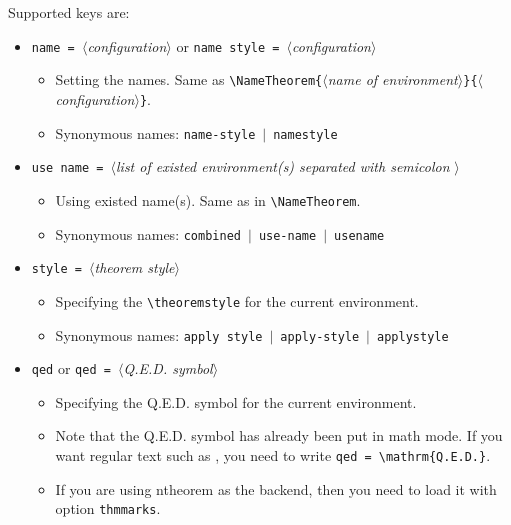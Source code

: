 \documentclass[classical]{einfart}
\newcommand{\meta}[1]{$\langle${\normalfont\itshape#1}$\rangle$}
\newcommand{\packageoption}[1]{\texttt{\textcolor{code-option}{#1}}}
\newcommand{\commandoption}[1]{\texttt{\textcolor{code-keys}{#1}}}
\begin{document}
Supported keys are:
\vspace{-.2\baselineskip}
\begin{itemize}[label=,leftmargin=1.25em,itemindent=-1.25em]
    \item \commandoption{name}\lstinline| = |\meta{configuration} \quad or \quad \commandoption{name style}\lstinline| = |\meta{configuration}
        \begin{itemize}
            \item Setting the names. Same as \lstinline|\NameTheorem{|\meta{name of environment}\lstinline|}{|\meta{configuration}\lstinline|}|.
            \item Synonymous names: \commandoption{name-style} \,$|$\, \commandoption{namestyle}
        \end{itemize}
    \item \commandoption{use name}\lstinline| = |\meta{list of existed environment(s) separated with semicolon \textquote{ ; }}
        \begin{itemize}
            \item Using existed name(s). Same as in \lstinline|\NameTheorem|.
            \item Synonymous names: \commandoption{combined} \,$|$\, \commandoption{use-name} \,$|$\, \commandoption{usename}
        \end{itemize}
    \item \commandoption{style}\lstinline| = |\meta{theorem style}
        \begin{itemize}
            \item Specifying the \lstinline|\theoremstyle| for the current environment.
            \item Synonymous names: \commandoption{apply style} \,$|$\, \commandoption{apply-style} \,$|$\, \commandoption{applystyle}
        \end{itemize}
    \item \commandoption{qed} or \commandoption{qed}\lstinline| = |\meta{Q.E.D. symbol}
        \begin{itemize}
            \item Specifying the Q.E.D. symbol for the current environment.
            \item Note that the Q.E.D. symbol has already been put in math mode. If you want regular text such as , you need to write \commandoption{qed}\lstinline| = \mathrm{Q.E.D.}|.
            \item If you are using \textsf{ntheorem} as the backend, then you need to load it with option \packageoption{thmmarks}.

\end{itemize}
\end{itemize}
\end{document}
